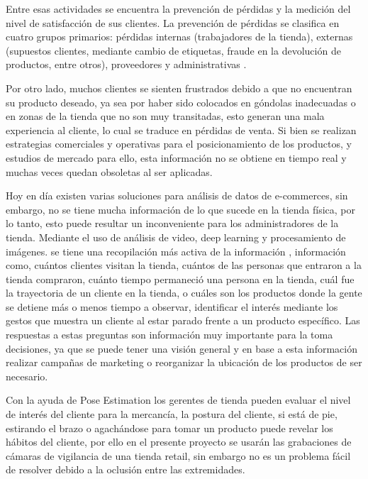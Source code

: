 \documentclass[conference]{IEEEtran}
\begin{document}
Entre esas actividades se encuentra la prevención de pérdidas y la medición del nivel de satisfacción de sus clientes. La prevención de pérdidas se clasifica en cuatro grupos primarios: pérdidas internas (trabajadores de la tienda), externas (supuestos clientes, mediante cambio de etiquetas, fraude en la devolución de productos, entre otros), proveedores y administrativas \cite{deyle2015global}.

Por otro lado, muchos clientes se sienten frustrados debido a que no encuentran su producto deseado, ya sea por haber sido colocados en góndolas inadecuadas o en zonas de la tienda que no son muy transitadas, esto generan una mala experiencia al cliente, lo cual se traduce en pérdidas de venta. Si bien se realizan estrategias comerciales y operativas para el posicionamiento de los productos, y estudios de mercado para ello, esta información no se obtiene en tiempo real y muchas veces quedan obsoletas al ser aplicadas.

Hoy en día existen varias soluciones para análisis de datos de e-commerces, sin embargo, no se tiene mucha información de lo que sucede en la tienda física, por lo tanto, esto puede resultar un inconveniente para los administradores de la tienda. Mediante el uso de análisis de video, deep learning y procesamiento de imágenes. se tiene una recopilación más activa de la información \cite{karim2018customer}, información como, cuántos clientes visitan la tienda, cuántos de las personas que entraron a la tienda compraron, cuánto tiempo permaneció una persona en la tienda, cuál fue la trayectoria de un cliente en la tienda, o cuáles son los productos donde la gente se detiene más o menos tiempo a observar, identificar el interés mediante los gestos que muestra un cliente al estar parado frente a un producto específico. Las respuestas a estas preguntas son  información muy importante para la toma decisiones, ya que  se puede tener una visión general y en base a esta información realizar campañas de marketing o reorganizar la ubicación de los productos de ser necesario.

Con la ayuda de Pose Estimation los gerentes de tienda pueden evaluar el nivel de interés del cliente para la mercancía, la postura del cliente, si está de pie, estirando el brazo o agachándose para tomar un producto puede revelar los hábitos del cliente, por ello en el presente proyecto se usarán las grabaciones de cámaras de vigilancia de una tienda retail, sin embargo no es un problema fácil de resolver debido a la oclusión entre las extremidades\cite{liu2018integral}.
\end{document}
